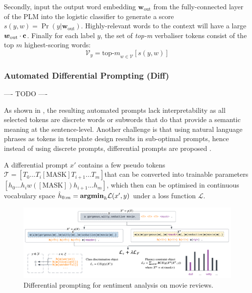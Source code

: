 Secondly, input the output word embedding $\boldsymbol{w}_{\text{out}}$ from the fully-connected layer of the PLM into the logistic classifier to generate a score $s(y, w) = \Pr(y|\boldsymbol{w}_{\text{out}})$. Highly-relevant words to the context will have a large  $\boldsymbol{w}_{\text{out}} \cdot \bold{c}$. Finally for each label $y$, the set of \emph{top-m} verbaliser tokens consist of the top $m$ highest-scoring words:
\begin{equation}
    \mathcal{V}_y = {\text{top-}m}_{w \in \mathcal{V}}[s(y,w)]
\end{equation}

\subsubsection{Automated Differential Prompting (Diff)}
---- TODO ----

As shown in , the resulting automated prompts lack interpretability as all selected tokens are discrete words or subwords that do that provide a semantic meaning at the sentence-level. Another challenge is that using natural language phrases as tokens in template design results in sub-optimal prompts, hence instead of using discrete prompts, differential prompts are proposed \cite{zhang2021differentiable}. 

A differential prompt $x'$ contains a few pseudo tokens $\mathcal{T} = [T_0... T_i [\text{MASK}]T_{i+1}...T_m]$that can be converted into trainable parameters $[h_0...h_iw([\text{MASK}])h_{i+1}...h_m]$, which then can be optimised in continuous vocabulary space $\hat{h}_{0:m} = \bold{argmin}_h \mathcal{L}(x', y)$ under a loss function $\mathcal{L}$.

\vspace{-0.5em}
\begin{figure}[!ht]
    \centering
    \includegraphics[width=\hsize]{figures/preparation_media/prepare-diff.pdf}
    \caption{Differential prompting for sentiment analysis on movie reviews.}
    \label{fig:prepare-diff}
\end{figure}

